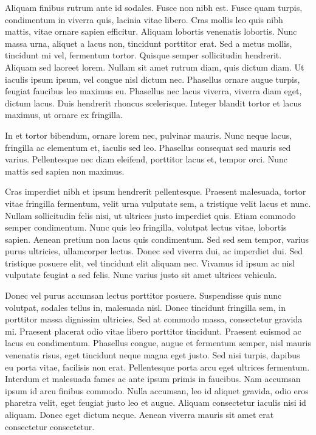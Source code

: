 \documentclass[10pt,openany]{book}
\begin{document}
Aliquam finibus rutrum ante id sodales. Fusce non nibh est. Fusce quam turpis, condimentum in viverra quis, lacinia vitae libero. Cras mollis leo quis nibh mattis, vitae ornare sapien efficitur. Aliquam lobortis venenatis lobortis. Nunc massa urna, aliquet a lacus non, tincidunt porttitor erat. Sed a metus mollis, tincidunt mi vel, fermentum tortor. Quisque semper sollicitudin hendrerit. Aliquam sed laoreet lorem. Nullam sit amet rutrum diam, quis dictum diam. Ut iaculis ipsum ipsum, vel congue nisl dictum nec. Phasellus ornare augue turpis, feugiat faucibus leo maximus eu. Phasellus nec lacus viverra, viverra diam eget, dictum lacus. Duis hendrerit rhoncus scelerisque. Integer blandit tortor et lacus maximus, ut ornare ex fringilla.

In et tortor bibendum, ornare lorem nec, pulvinar mauris. Nunc neque lacus, fringilla ac elementum et, iaculis sed leo. Phasellus consequat sed mauris sed varius. Pellentesque nec diam eleifend, porttitor lacus et, tempor orci. Nunc mattis sed sapien non maximus.

Cras imperdiet nibh et ipsum hendrerit pellentesque. Praesent malesuada, tortor vitae fringilla fermentum, velit urna vulputate sem, a tristique velit lacus et nunc. Nullam sollicitudin felis nisi, ut ultrices justo imperdiet quis. Etiam commodo semper condimentum. Nunc quis leo fringilla, volutpat lectus vitae, lobortis sapien. Aenean pretium non lacus quis condimentum. Sed sed sem tempor, varius purus ultricies, ullamcorper lectus. Donec sed viverra dui, ac imperdiet dui. Sed tristique posuere elit, vel tincidunt elit aliquam nec. Vivamus id ipsum ac nisl vulputate feugiat a sed felis. Nunc varius justo sit amet ultrices vehicula.

Donec vel purus accumsan lectus porttitor posuere. Suspendisse quis nunc volutpat, sodales tellus in, malesuada nisl. Donec tincidunt fringilla sem, in porttitor massa dignissim ultricies. Sed at commodo massa, consectetur gravida mi. Praesent placerat odio vitae libero porttitor tincidunt. Praesent euismod ac lacus eu condimentum. Phasellus congue, augue et fermentum semper, nisl mauris venenatis risus, eget tincidunt neque magna eget justo. Sed nisi turpis, dapibus eu porta vitae, facilisis non erat. Pellentesque porta arcu eget ultrices fermentum. Interdum et malesuada fames ac ante ipsum primis in faucibus. Nam accumsan ipsum id arcu finibus commodo. Nulla accumsan, leo id aliquet gravida, odio eros pharetra velit, eget feugiat justo leo et augue. Aliquam consectetur iaculis nisi id aliquam. Donec eget dictum neque. Aenean viverra mauris sit amet erat consectetur consectetur.
\end{document}
